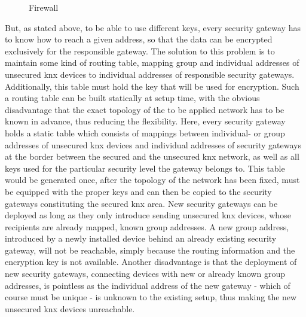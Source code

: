 \begin{figure}
 
 \caption{Firewall}
 \label{fig:firewall}
\end{figure}



But, as stated above, to be able to use different keys, every security gateway has to know how to reach a given address, so that the data can be encrypted
exclusively for the responsible gateway. The solution to this problem is to maintain some kind of routing table, mapping group and individual addresses of unsecured
knx devices to individual addresses of responsible security gateways. Additionally, this table must hold the key that will be used for encryption.
Such a routing table can be built statically at setup time, with the obvious disadvantage
that the exact topology of the to be applied network has to be known in advance, thus reducing the flexibility. Here, every security gateway holds a static 
table which consists of mappings between individual- or group addresses of unsecured knx devices and individual addresses of security gateways at the border
between the secured and the unsecured knx network, as well as all keys used for the particular security level the gateway belongs to.
This table would be generated once, after the topology of the network has been fixed, must be equipped with the proper keys and can then
be copied to the security gateways constituting the secured knx area. New security gateways can be deployed as long as they only introduce sending 
unsecured knx devices, whose recipients are already mapped, known group addresses. A new group address, introduced by a newly installed device behind
an already existing security gateway, will not be reachable, simply because the routing information and the encryption key is not available. 
Another disadvantage is that the deployment of new
security gateways, connecting devices with new or already known group addresses, is pointless as the individual address of the new gateway - which of
course must be unique - is unknown to the existing setup, thus making the new unsecured knx devices unreachable.

